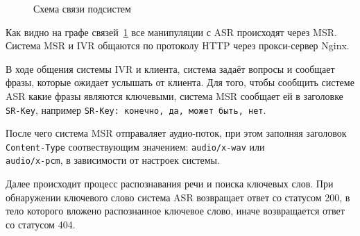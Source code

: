 \begin{figure}[h!]
    \centering
    \caption{Схема связи подсистем}
    \label{fig:schema}
\end{figure}

Как видно на графе связей~\ref{fig:schema} все манипуляции с ASR происходят через
MSR. Система MSR и IVR общаются по протоколу HTTP через прокси-сервер Nginx.

В ходе общения системы IVR и клиента, система задаёт вопросы и сообщает фразы,
которые ожидает услышать от клиента. Для того, чтобы сообщить системе ASR какие
фразы являются ключевыми, система MSR сообщает ей в заголовке \texttt{SR-Key},
например \texttt{SR-Key: конечно, да, может быть, нет}.

После чего система MSR отправаляет аудио-поток, при этом заполняя заголовок
\texttt{Content-Type} соотвествующим значением: \texttt{audio/x-wav} или \\
\texttt{audio/x-pcm}, в зависимости от настроек системы.

Далее происходит процесс распознавания речи и поиска ключевых слов. При обнаружении
ключевого слово система ASR возвращает ответ со статусом 200, в тело которого
вложено распознанное ключевое слово, иначе возвращается ответ со статусом 404.
